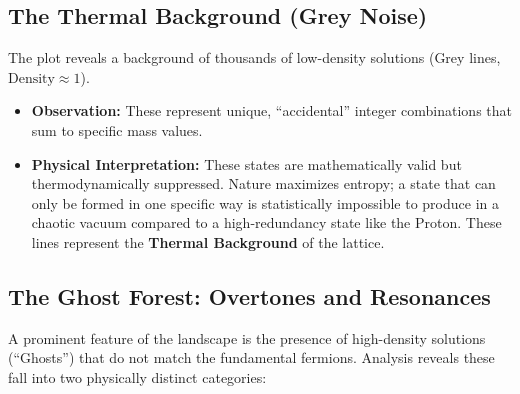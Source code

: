 \subsection{The Thermal Background (Grey Noise)}

The plot reveals a background of thousands of low-density solutions (Grey lines, $\text{Density} \approx 1$).

\begin{itemize}
    \item \textbf{Observation:} These represent unique, ``accidental'' integer combinations that sum to specific mass values.
    \item \textbf{Physical Interpretation:} These states are mathematically valid but thermodynamically suppressed. Nature maximizes entropy; a state that can only be formed in one specific way is statistically impossible to produce in a chaotic vacuum compared to a high-redundancy state like the Proton. These lines represent the \textbf{Thermal Background} of the lattice.
\end{itemize}

\subsection{The Ghost Forest: Overtones and Resonances}

A prominent feature of the landscape is the presence of high-density solutions (``Ghosts'') that do not match the fundamental fermions. Analysis reveals these fall into two physically distinct categories:

